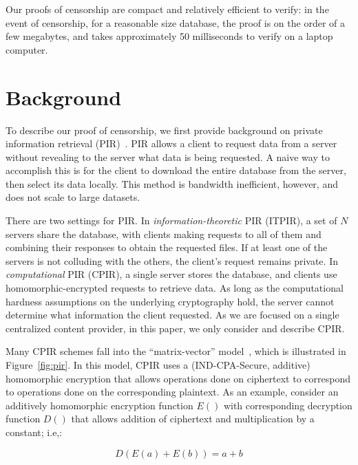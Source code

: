 Our proofs of censorship are compact and relatively efficient to verify: in the
event of censorship, for a reasonable size database, the proof is on the order
of a few megabytes, and takes approximately 50 milliseconds to verify on a laptop
computer.


%

\section{Background}

\FigPIR

To describe our proof of censorship, we first provide background on private
information retrieval (PIR)~\cite{pir}. PIR allows a client to request data from a server
without revealing to the server what data is being requested. A naive way to
accomplish this is for the client to download the entire database from the
server, then select its data locally. This method is bandwidth inefficient,
however, and does not scale to large datasets.

There are two settings for PIR. In \emph{information-theoretic} PIR (ITPIR), a
set of $N$ servers share the database, with clients making requests to all of
them and combining their responses to obtain the requested files. If at least
one of the servers is not colluding with the others, the client's request
remains private. In \emph{computational} PIR (CPIR), a single server stores the
database, and clients use homomorphic-encrypted requests to retrieve data. As
long as the computational hardness assumptions on the underlying cryptography
hold, the server cannot determine what information the client requested. As we
are focused on a single centralized content provider, in this paper, we only
consider and describe CPIR.

Many CPIR schemes fall into the ``matrix-vector'' 
model~\cite{cryptoeprint:2017:825}, which is illustrated in 
Figure~\ref{fig:pir}. In this model, CPIR uses a (IND-CPA-Secure, additive)
homomorphic encryption that allows operations done on ciphertext to correspond
to operations done on the corresponding plaintext. As an example, consider an
additively homomorphic encryption function $E()$ with corresponding decryption
function $D()$  that allows addition of ciphertext  and multiplication by a
constant; i.e,:

$$D(E(a) + E(b)) = a + b$$

